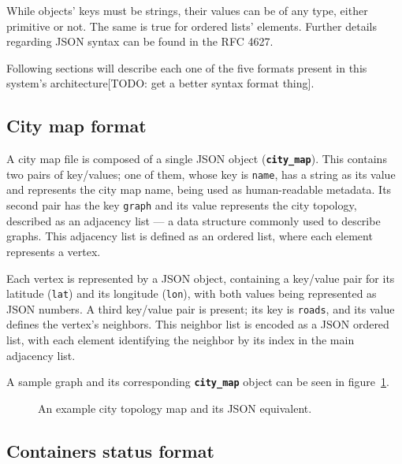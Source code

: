 While objects' keys must be strings, their values can be of any type, either
primitive or not. The same is true for ordered lists' elements. Further details
regarding JSON syntax can be found in the RFC 4627\citep{site:rfc-json}.

Following sections will describe each one of the five formats present in this
system's architecture[TODO: get a better syntax format thing].






\subsection{City map format}
\label{section:map-format}

A city map file is composed of a single JSON object
(\textbf{\texttt{city\_map}}). This contains two pairs of key/values; one of
them, whose key is \texttt{name}, has a string as its value and represents the
city map name, being used as human-readable metadata. Its second pair has the
key \texttt{graph} and its value represents the city topology, described as an
adjacency list --- a data structure commonly used to describe graphs.  This
adjacency list is defined as an ordered list, where each element represents a
vertex.

Each vertex is represented by a JSON object, containing a key/value pair for
its latitude (\texttt{lat}) and its longitude (\texttt{lon}), with both values
being represented as JSON numbers. A third key/value pair is present; its key
is \texttt{roads}, and its value defines the vertex's neighbors. This neighbor
list is encoded as a JSON ordered list, with each element identifying the
neighbor by its index in the main adjacency list.

A sample graph and its corresponding \textbf{\texttt{city\_map}} object can be
seen in figure~\ref{fig:city-map-example}.


\begin{figure}[th]
  \begin{center}
    \leavevmode
    
    \caption{An example city topology map and its JSON equivalent.}
    \label{fig:city-map-example}
  \end{center}
\end{figure}




\newpage
\subsection{Containers status format}
\label{section:container-format}

